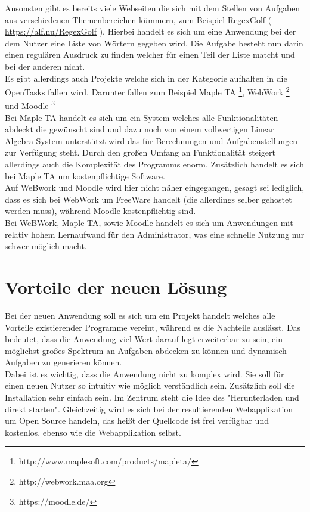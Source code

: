 Ansonsten gibt es bereits viele Webseiten die sich mit dem Stellen von Aufgaben aus verschiedenen Themenbereichen kümmern, zum Beispiel RegexGolf ( \url{https://alf.nu/RegexGolf} ). Hierbei handelt es sich um eine Anwendung bei der dem Nutzer eine Liste von Wörtern gegeben wird. Die Aufgabe besteht nun darin einen regulären Ausdruck zu finden welcher für einen Teil der Liste matcht und bei der anderen nicht. \\

Es gibt allerdings auch Projekte welche sich in der Kategorie aufhalten in die OpenTasks fallen wird. Darunter fallen zum Beispiel Maple TA \footnote{http://www.maplesoft.com/products/mapleta/}, WebWork \footnote{http://webwork.maa.org} und Moodle \footnote{https://moodle.de/} \\
Bei Maple TA handelt es sich um ein System welches alle Funktionalitäten abdeckt die gewünscht sind und dazu noch von einem vollwertigen Linear Algebra System unterstützt wird das für Berechnungen und Aufgabenstellungen zur Verfügung steht. Durch den großen Umfang an Funktionalität steigert allerdings auch die Komplexität des Programms enorm. Zusätzlich handelt es sich bei Maple TA um kostenpflichtige Software.\\
Auf WeBwork und Moodle wird hier nicht näher eingegangen, gesagt sei lediglich, dass es sich bei WebWork um FreeWare handelt (die allerdings selber gehostet werden muss), während Moodle kostenpflichtig sind. \\
Bei WeBWork, Maple TA, sowie Moodle handelt es sich um Anwendungen mit relativ hohem Lernaufwand für den Administrator, was eine schnelle Nutzung nur schwer möglich macht.


\section{Vorteile der neuen Lösung}

Bei der neuen Anwendung soll es sich um ein Projekt handelt welches alle Vorteile existierender Programme vereint, während es die Nachteile auslässt. Das bedeutet, dass die Anwendung viel Wert darauf legt erweiterbar zu sein, ein möglichst großes Spektrum an Aufgaben abdecken zu können und dynamisch Aufgaben zu generieren können. \\
Dabei ist es wichtig, dass die Anwendung nicht zu komplex wird. Sie soll für einen neuen Nutzer so intuitiv wie möglich verständlich sein. Zusätzlich soll die Installation sehr einfach sein. Im Zentrum steht die Idee des "Herunterladen und direkt starten".
Gleichzeitig wird es sich bei der resultierenden Webapplikation um Open Source handeln, das heißt der Quellcode ist frei verfügbar und kostenlos, ebenso wie die Webapplikation selbst.

